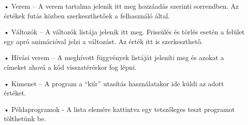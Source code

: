     • Verem – A verem tartalma jelenik itt meg hozzáadás szerinti sorrendben. Az értékek futás közben szerkeszthetőek a felhasználó által.

    • Változók – A változók listája jelenik itt meg. Frissülés és törlés esetén a felület egy apró animációval jelzi a változást. Az érték itt is szerkeszthető.

    • Hívási verem – A meghívott függvények listáját jeleníti meg és azokat a címeket ahová a kód visszatéréskor fog lépni.

    • Kimenet – A program a “kiír” utasítás használatakor ide küldi az adott értéket.

    • Példaprogramok - A lista elemére kattintva egy tetszőleges teszt programot tölthetünk be.